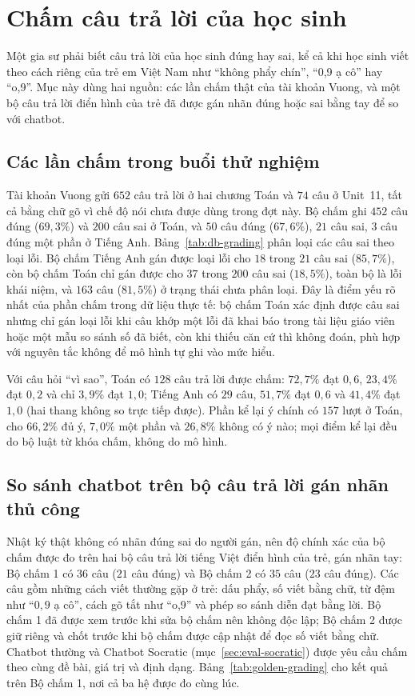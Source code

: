 \section{Chấm câu trả lời của học sinh}\label{sec:eval-grading}

Một gia sư phải biết câu trả lời của học sinh đúng hay sai, kể cả khi học sinh viết theo cách riêng của trẻ em Việt Nam như ``không phẩy chín'', ``0,9 ạ cô'' hay ``o,9''. Mục này dùng hai nguồn: các lần chấm thật của tài khoản Vuong, và một bộ câu trả lời điển hình của trẻ đã được gán nhãn đúng hoặc sai bằng tay để so với chatbot.

\subsection{Các lần chấm trong buổi thử nghiệm}
Tài khoản Vuong gửi $652$ câu trả lời ở hai chương Toán và $74$ câu ở Unit~11, tất cả bằng chữ gõ vì chế độ nói chưa được dùng trong đợt này. Bộ chấm ghi $452$ câu đúng ($69{,}3\%$) và $200$ câu sai ở Toán, và $50$ câu đúng ($67{,}6\%$), $21$ câu sai, $3$ câu đúng một phần ở Tiếng Anh. Bảng~\ref{tab:db-grading} phân loại các câu sai theo loại lỗi. Bộ chấm Tiếng Anh gán được loại lỗi cho $18$ trong $21$ câu sai ($85{,}7\%$), còn bộ chấm Toán chỉ gán được cho $37$ trong $200$ câu sai ($18{,}5\%$), toàn bộ là lỗi khái niệm, và $163$ câu ($81{,}5\%$) ở trạng thái chưa phân loại. Đây là điểm yếu rõ nhất của phần chấm trong dữ liệu thực tế: bộ chấm Toán xác định được câu sai nhưng chỉ gán loại lỗi khi câu khớp một lỗi đã khai báo trong tài liệu giáo viên hoặc một mẫu so sánh số đã biết, còn khi thiếu căn cứ thì không đoán, phù hợp với nguyên tắc không để mô hình tự ghi vào mức hiểu.



Với câu hỏi ``vì sao'', Toán có $128$ câu trả lời được chấm: $72{,}7\%$ đạt $0{,}6$, $23{,}4\%$ đạt $0{,}2$ và chỉ $3{,}9\%$ đạt $1{,}0$; Tiếng Anh có $29$ câu, $51{,}7\%$ đạt $0{,}6$ và $41{,}4\%$ đạt $1{,}0$ (hai thang không so trực tiếp được). Phần kể lại ý chính có $157$ lượt ở Toán, cho $66{,}2\%$ đủ ý, $7{,}0\%$ một phần và $26{,}8\%$ không có ý nào; mọi điểm kể lại đều do bộ luật từ khóa chấm, không do mô hình.

\subsection{So sánh chatbot trên bộ câu trả lời gán nhãn thủ công}
Nhật ký thật không có nhãn đúng sai do người gán, nên độ chính xác của bộ chấm được đo trên hai bộ câu trả lời tiếng Việt điển hình của trẻ, gán nhãn tay: Bộ chấm 1 có $36$ câu ($21$ câu đúng) và Bộ chấm 2 có $35$ câu ($23$ câu đúng). Các câu gồm những cách viết thường gặp ở trẻ: dấu phẩy, số viết bằng chữ, từ đệm như ``$0{,}9$ ạ cô'', cách gõ tắt như ``o,9'' và phép so sánh diễn đạt bằng lời. Bộ chấm 1 đã được xem trước khi sửa bộ chấm nên không độc lập; Bộ chấm 2 được giữ riêng và chốt trước khi bộ chấm được cập nhật để đọc số viết bằng chữ. Chatbot thường và Chatbot Socratic (mục~\ref{sec:eval-socratic}) được yêu cầu chấm theo cùng đề bài, giá trị và định dạng. Bảng~\ref{tab:golden-grading} cho kết quả trên Bộ chấm 1, nơi cả ba hệ được đo cùng lúc.

